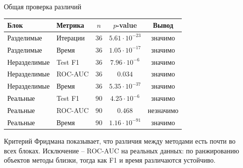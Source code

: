 \SPBGContentSlide
  {Общая проверка различий}
  {%
    \centering
    \TinyBody
    \renewcommand{\arraystretch}{1.16}
    \setlength{\tabcolsep}{5pt}
    \begin{tabular}{|l|l|c|c|c|}
      \hline
      \textbf{Блок} & \textbf{Метрика} & \textbf{$n$} & \textbf{$p$-value} & \textbf{Вывод} \\
      \hline
      Разделимые & Итерации & 36 & $5.61\cdot10^{-23}$ & значимо \\
      \hline
      Разделимые & Время & 36 & $1.05\cdot10^{-17}$ & значимо \\
      \hline
      Неразделимые & Test F1 & 36 & $7.96\cdot10^{-6}$ & значимо \\
      \hline
      Неразделимые & ROC-AUC & 36 & $0.034$ & значимо \\
      \hline
      Неразделимые & Время & 36 & $5.35\cdot10^{-37}$ & значимо \\
      \hline
      Реальные & Test F1 & 90 & $4.25\cdot10^{-6}$ & значимо \\
      \hline
      Реальные & ROC-AUC & 90 & $0.468$ & незначимо \\
      \hline
      Реальные & Время & 90 & $1.16\cdot10^{-91}$ & значимо \\
      \hline
    \end{tabular}

    \vspace{.18cm}
    \begin{minipage}{.88\linewidth}
      \SmallBody
      \raggedright
      Критерий Фридмана показывает, что различия между методами есть почти во
      всех блоках. Исключение -- ROC-AUC на реальных данных: по ранжированию
      объектов методы близки, тогда как F1 и время различаются устойчиво.
    \end{minipage}
  }
